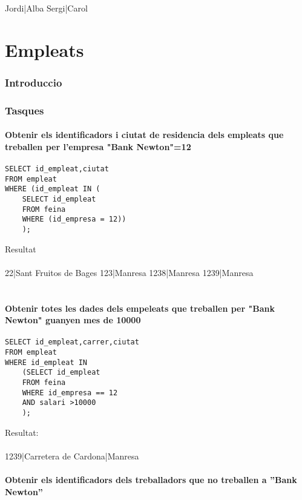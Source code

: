 \documentclass[11p]{article}
\begin{document}
Jordi|Alba
Sergi|Carol



\part{Empleats}

\section{Introduccio}

\section{Tasques}

\subsection{Obtenir els identificadors i ciutat de residencia dels empleats que treballen per l'empresa "Bank Newton"=12} 
\begin{lstlisting}
SELECT id_empleat,ciutat
FROM empleat 
WHERE (id_empleat IN (
	SELECT id_empleat 
	FROM feina 
	WHERE (id_empresa = 12))
	);
\end{lstlisting}

Resultat\\\\
22|Sant Fruitos de Bages
123|Manresa
1238|Manresa
1239|Manresa\\\\

\subsection{Obtenir totes les dades dels empeleats que treballen per "Bank Newton" guanyen mes de 10000}
\begin{lstlisting}
SELECT id_empleat,carrer,ciutat 
FROM empleat 
WHERE id_empleat IN 
	(SELECT id_empleat 
	FROM feina 
	WHERE id_empresa == 12 
	AND salari >10000
	);
\end{lstlisting}

Resultat:\\\\
1239|Carretera de Cardona|Manresa

\subsection{Obtenir els identificadors dels treballadors que no treballen a ”Bank Newton”}
\end{document}
